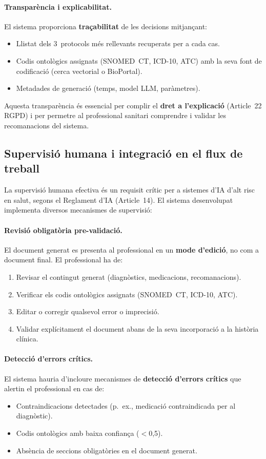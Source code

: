 \documentclass[CAT]{TFUOC}%
\begin{document}
\paragraph{Transparència i explicabilitat.}
El sistema proporciona \textbf{traçabilitat} de les decisions mitjançant:
\begin{itemize}
    \item Llistat dels 3~protocols més rellevants recuperats per a cada cas.
    \item Codis ontològics assignats (SNOMED~CT, ICD-10, ATC) amb la seva font de codificació (cerca vectorial o BioPortal).
    \item Metadades de generació (temps, model LLM, paràmetres).
\end{itemize}

Aquesta transparència és essencial per complir el \textbf{dret a l'explicació} (Article~22 RGPD) i per permetre al professional sanitari comprendre i validar les recomanacions del sistema.

\subsection{Supervisió humana i integració en el flux de treball}

La supervisió humana efectiva és un requisit crític per a sistemes d'IA d'alt risc en salut, segons el Reglament d'IA (Article~14). El sistema desenvolupat implementa diversos mecanismes de supervisió:

\paragraph{Revisió obligatòria pre-validació.}
El document generat es presenta al professional en un \textbf{mode d'edició}, no com a document final. El professional ha de:
\begin{enumerate}
    \item Revisar el contingut generat (diagnòstics, medicacions, recomanacions).
    \item Verificar els codis ontològics assignats (SNOMED~CT, ICD-10, ATC).
    \item Editar o corregir qualsevol error o imprecisió.
    \item Validar explícitament el document abans de la seva incorporació a la història clínica.
\end{enumerate}

\paragraph{Detecció d'errors crítics.}
El sistema hauria d'incloure mecanismes de \textbf{detecció d'errors crítics} que alertin el professional en cas de:
\begin{itemize}
    \item Contraindicacions detectades (p.~ex., medicació contraindicada per al diagnòstic).
    \item Codis ontològics amb baixa confiança ($<$0,5).
    \item Absència de seccions obligatòries en el document generat.
\end{itemize}
\end{document}
